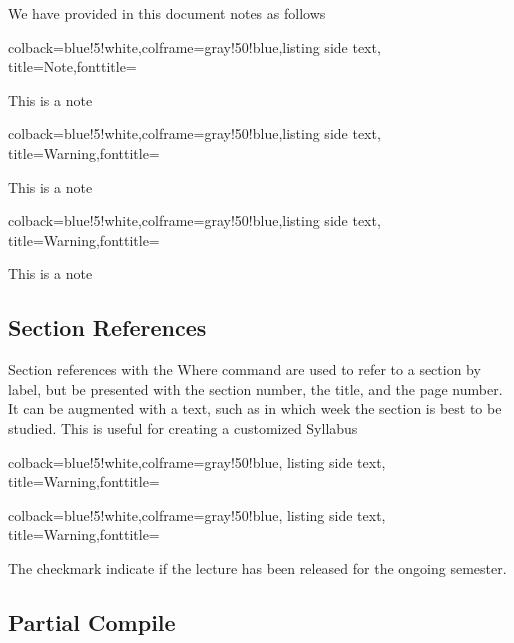 We have provided in this document notes as follows


\begin{tcblisting}{colback=blue!5!white,colframe=gray!50!blue,listing side text,  title=Note,fonttitle=\bfseries}
\begin{NOTE}
This is a note
\end{NOTE}
\end{tcblisting}

\begin{tcblisting}{colback=blue!5!white,colframe=gray!50!blue,listing side text,  title=Warning,fonttitle=\bfseries}
\begin{WARNING}
This is a note
\end{WARNING}
\end{tcblisting}

\begin{tcblisting}{colback=blue!5!white,colframe=gray!50!blue,listing side text,  title=Warning,fonttitle=\bfseries}
\begin{IU}
This is a note
\end{IU}
\end{tcblisting}

\subsection{Section References}

Section references with the Where command are used to refer to a
section by label, but be presented with the section number, the title,
and the page number. It can be augmented with a text, such as in which
week the section is best to be studied. This is useful for creating a
customized Syllabus

\begin{tcblisting}{colback=blue!5!white,colframe=gray!50!blue,
    listing side text, title=Warning,fonttitle=\bfseries}
\end{tcblisting}

\begin{tcblisting}{colback=blue!5!white,colframe=gray!50!blue,
    listing side text, title=Warning,fonttitle=\bfseries}
\end{tcblisting}

The checkmark indicate if the lecture has been released for the
ongoing semester.

\subsection{Partial Compile}


